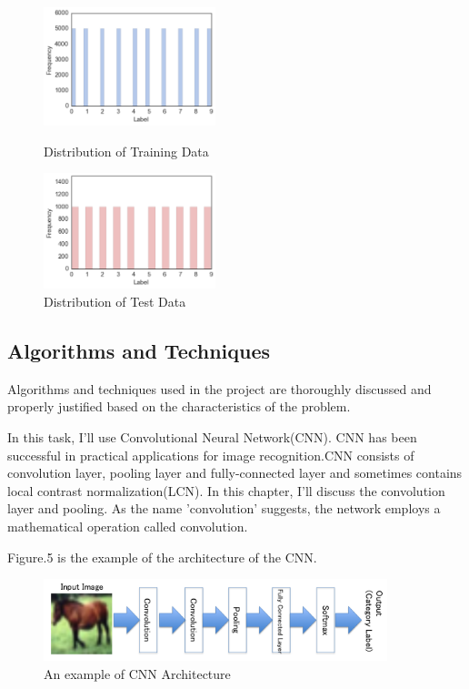 \documentclass[a4paper,10pt,fleqn]{article}
\begin{document}
\begin{figure}[h]
\begin{minipage}{0.5\hsize}
	\begin{center}
	\includegraphics[width=5cm]{picture/Distribution_of_Training_Data.png}
	\end{center}
	\caption{Distribution of Training Data}
	\label{fig:three}
\end{minipage}
\begin{minipage}{0.5\hsize}
\begin{center}
\includegraphics[width=5cm]{picture/Distribution_of_Test_Data.png}
\end{center}
 \caption{Distribution of Test Data}
  \label{fig:four}
 \end{minipage}
\end{figure}


\subsection{Algorithms and Techniques}
Algorithms and techniques used in the project are thoroughly discussed and properly justified based on the characteristics of the problem.

In this task, I'll use Convolutional Neural Network(CNN). CNN has been successful in  practical applications for image recognition.CNN consists of convolution layer, pooling layer and fully-connected layer and sometimes contains local contrast normalization(LCN). In this chapter, I'll discuss the convolution layer and pooling.
As the name 'convolution' suggests, the network employs a mathematical operation called convolution. 

Figure.5 is the example of the architecture of the CNN.
\begin{figure}[htbp]

	\begin{center}
	\includegraphics[width=10cm]{picture/Architecture_of_CNN.png}
	\caption{An example of CNN Architecture}
	\end{center}
	\label{fig:five}

\end{figure}
\end{document}
